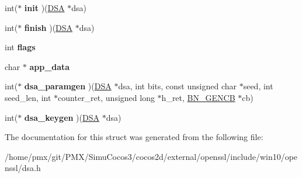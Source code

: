 \begin{DoxyCompactItemize}
\item 
\mbox{\label{structdsa__method_acfaf05310756308b9849f278cdfd91c6}} 
int($\ast$ {\bfseries init} )(\hyperlink{structdsa__st}{D\+SA} $\ast$dsa)
\item 
\mbox{\label{structdsa__method_aad9fed78046fe8c6f995ba9ee8bd59d2}} 
int($\ast$ {\bfseries finish} )(\hyperlink{structdsa__st}{D\+SA} $\ast$dsa)
\item 
\mbox{\label{structdsa__method_ae5a10b0b8d5b139e5818da8da5223ebc}} 
int {\bfseries flags}
\item 
\mbox{\label{structdsa__method_a08528c35da49dcebc0675cb9b66bbeb9}} 
char $\ast$ {\bfseries app\+\_\+data}
\item 
\mbox{\label{structdsa__method_a22d30cb3e62b00cbb818f7d2bacb99f7}} 
int($\ast$ {\bfseries dsa\+\_\+paramgen} )(\hyperlink{structdsa__st}{D\+SA} $\ast$dsa, int bits, const unsigned char $\ast$seed, int seed\+\_\+len, int $\ast$counter\+\_\+ret, unsigned long $\ast$h\+\_\+ret, \hyperlink{structbn__gencb__st}{B\+N\+\_\+\+G\+E\+N\+CB} $\ast$cb)
\item 
\mbox{\label{structdsa__method_a55bf9cc2d75b43788806388a6e924eb1}} 
int($\ast$ {\bfseries dsa\+\_\+keygen} )(\hyperlink{structdsa__st}{D\+SA} $\ast$dsa)
\end{DoxyCompactItemize}


The documentation for this struct was generated from the following file\+:\begin{DoxyCompactItemize}
\item 
/home/pmx/git/\+P\+M\+X/\+Simu\+Cocos3/cocos2d/external/openssl/include/win10/openssl/dsa.\+h\end{DoxyCompactItemize}
